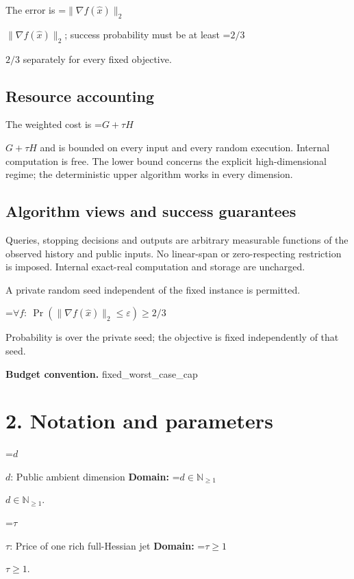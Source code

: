 \documentclass[10pt,a4paper]{article}
\newcommand{\AtlasMath}[1]{\par\begingroup\centering\setbox0=\hbox{$\displaystyle #1$}\ifdim\wd0>1.4\linewidth\typeout{ATLAS WIDE FORMULA: \the\wd0}\fi\ifdim\wd0>\linewidth\resizebox{\linewidth}{!}{\box0}\else\box0\fi\par\endgroup}
\newcommand{\AtlasInlineMath}[1]{\begingroup\setbox0=\hbox{$#1$}\ifdim\wd0>.4\linewidth\endgroup\AtlasMath{#1}\else\endgroup$#1$\fi}
\begin{document}
The error is \AtlasInlineMath{\|\nabla f(\widehat x)\|_2}; success probability must be at least \AtlasInlineMath{2/3} separately for every fixed objective.



\subsection{Resource accounting}


The weighted cost is \AtlasInlineMath{G+\tau H} and is bounded on every input and every random execution. Internal computation is free. The lower bound concerns the explicit high-dimensional regime; the deterministic upper algorithm works in every dimension.



\subsection{Algorithm views and success guarantees}


Queries, stopping decisions and outputs are arbitrary measurable functions of the observed history and public inputs. No linear-span or zero-respecting restriction is imposed. Internal exact-real computation and storage are uncharged.



A private random seed independent of the fixed instance is permitted.




\AtlasMath{\forall f:\ \Pr(\|\nabla f(\widehat x)\|_2\le\varepsilon)\ge2/3}




Probability is over the private seed; the objective is fixed independently of that seed.



\textbf{Budget convention.} fixed\_worst\_case\_cap



\section{2. Notation and parameters}


\AtlasInlineMath{d}: Public ambient dimension \textbf{Domain:} \AtlasInlineMath{d\in\mathbb N_{\ge1}}.



\AtlasInlineMath{\tau}: Price of one rich full-Hessian jet \textbf{Domain:} \AtlasInlineMath{\tau\ge1}.
\end{document}
